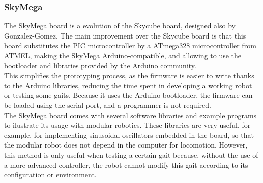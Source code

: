 \subsubsection{SkyMega}
\label{hardware_skymega}

The SkyMega board \cite{gonzalez-gomez_website:skymega} is a evolution of the Skycube board, designed also by Gonzalez-Gomez. The main improvement over the Skycube board is that this board substitutes the PIC microcontroller by a ATmega328 microcontroller from ATMEL, making the SkyMega Arduino-compatible, and allowing to use the bootloader and libraries provided by the Arduino community.\\

This simplifies the prototyping process, as the firmware is easier to write thanks to the Arduino libraries, reducing the time spent in developing a working robot or testing some gaits. Because it uses the Arduino bootloader, the firmware can be loaded using the serial port, and a programmer is not required.\\

The SkyMega board comes with several software libraries and example programs to ilustrate its usage with modular robotics. These libraries are very useful, for example, for implementing sinusoidal oscillators embedded in the board, so that the modular robot does not depend in the computer for locomotion. However, this method is only useful when testing a certain gait because, without the use of a more advanced controller, the robot cannot modify this gait according to its configuration or environment.\\

